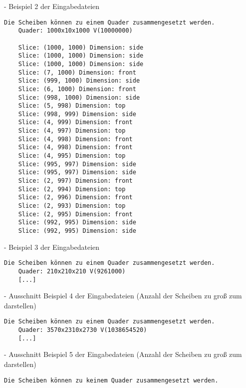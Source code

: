 \documentclass[a4paper,10pt,ngerman]{scrartcl}
\begin{document}
    - Beispiel 2 der Eingabedateien

    \newpage


    \begin{lstlisting}[frame=single, title=Programmausgabe kaese3.txt, breaklines=true,label={lst:lstlisting8}]
    Die Scheiben können zu einem Quader zusammengesetzt werden.
    Quader: 1000x10x1000 V(10000000)

    Slice: (1000, 1000) Dimension: side
    Slice: (1000, 1000) Dimension: side
    Slice: (1000, 1000) Dimension: side
    Slice: (7, 1000) Dimension: front
    Slice: (999, 1000) Dimension: side
    Slice: (6, 1000) Dimension: front
    Slice: (998, 1000) Dimension: side
    Slice: (5, 998) Dimension: top
    Slice: (998, 999) Dimension: side
    Slice: (4, 999) Dimension: front
    Slice: (4, 997) Dimension: top
    Slice: (4, 998) Dimension: front
    Slice: (4, 998) Dimension: front
    Slice: (4, 995) Dimension: top
    Slice: (995, 997) Dimension: side
    Slice: (995, 997) Dimension: side
    Slice: (2, 997) Dimension: front
    Slice: (2, 994) Dimension: top
    Slice: (2, 996) Dimension: front
    Slice: (2, 993) Dimension: top
    Slice: (2, 995) Dimension: front
    Slice: (992, 995) Dimension: side
    Slice: (992, 995) Dimension: side
    \end{lstlisting}

    - Beispiel 3 der Eingabedateien

    \begin{lstlisting}[frame=single, title=Ausschnitt der Programmausgabe kaese4.txt, breaklines=true,label={lst:lstlisting9}]
    Die Scheiben können zu einem Quader zusammengesetzt werden.
    Quader: 210x210x210 V(9261000)
    [...]
    \end{lstlisting}

    - Ausschnitt Beispiel 4 der Eingabedateien
    (Anzahl der Scheiben zu groß zum darstellen)

    \begin{lstlisting}[frame=single, title=Ausschnitt der Programmausgabe kaese5.txt, breaklines=true,label={lst:lstlisting10}]
    Die Scheiben können zu einem Quader zusammengesetzt werden.
    Quader: 3570x2310x2730 V(1038654520)
    [...]
    \end{lstlisting}

    - Ausschnitt Beispiel 5 der Eingabedateien
    (Anzahl der Scheiben zu groß zum darstellen)

    \begin{lstlisting}[frame=single, title=Programmausgabe kaese6.txt, breaklines=true,label={lst:lstlisting11}]
    Die Scheiben können zu keinem Quader zusammengesetzt werden.
    \end{lstlisting}
\end{document}

